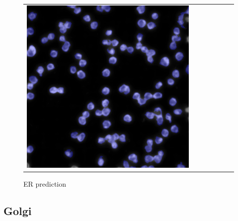 \begin{figure}[H]
\begin{tabularx}{\textwidth}{YYYYYYY}
            \includegraphics{bilder/ER/segmentation/pp_7.png} 
        \end{tabularx}
    \caption{ER prediction}
\end{figure}


\subsection{Golgi}

